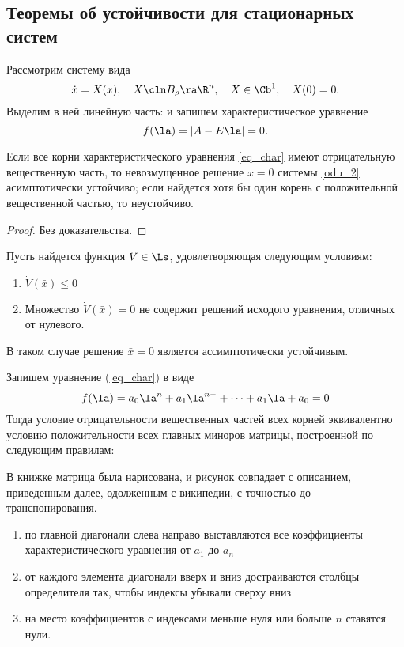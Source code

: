 \documentclass[a4paper,12pt]{article}
\newcommand{\eql}[2]{\begin{equation}\label{#2}#1\end{equation}}
\begin{document}
\subsection{Теоремы об устойчивости для стационарных систем}

Рассмотрим систему вида
\eql{\dot{x}=X(x),\quad X\cln B_{\rho}\ra\R^n,\quad X \in \Cb^1,\quad X(0)=0.}{odu_2} Выделим
в ней линейную часть:
 и запишем
характеристическое уравнение \eql{f(\la)=|A-E\la|=0.}{eq_char}
\begin{theorem}[А.\,М.\,Ляпунов]
\label{th_lyap_1}
Если все корни характеристического уравнения \eqref{eq_char} имеют отрицательную вещественную
часть, то невозмущенное решение $x=0$ системы \eqref{odu_2} асимптотически устойчиво; если
найдется хотя бы один корень с положительной вещественной частью, то неустойчиво.
\end{theorem}
\begin{proof}
Без доказательства.
\end{proof}
\begin{theorem}
 Пусть найдется функция $V\in\Ls$, удовлетворяющая следующим условиям:
 \begin{enumerate}
 \item $\dot V(\bar x) \le 0$
 \item Множество $\dot V(\bar x) = 0$ не содержит решений исходого уравнения, отличных от нулевого.
 \end{enumerate}
 В таком случае решение $\bar x = 0$ является ассимптотически устойчивым.
\end{theorem}

\begin{theorem}
  Запишем уравнение (\ref{eq_char}) в виде
\begin{displaymath}
 f(\la) = a_0\la^n+a_1\la^{n-}+\dots+a_1\la+a_0 =0
\end{displaymath}
Тогда условие отрицательности вещественных частей всех корней
эквивалентно условию положительности всех главных миноров матрицы,
построенной по следующим правилам:
  \begin{petit}
        В книжке матрица была нарисована, и рисунок совпадает с
        описанием, приведенным далее, одолженным с википедии, с точностью до транспонирования.
  \end{petit}
  \begin{enumerate}
  \item по главной диагонали слева направо выставляются все
    коэффициенты характеристического уравнения от $a_1$ до $a_n$
  \item от каждого элемента диагонали вверх и вниз достраиваются
    столбцы определителя так, чтобы индексы убывали сверху вниз
  \item на место коэффициентов с индексами меньше нуля или больше $n$ ставятся нули.
  \end{enumerate}
\end{theorem}
\end{document}
